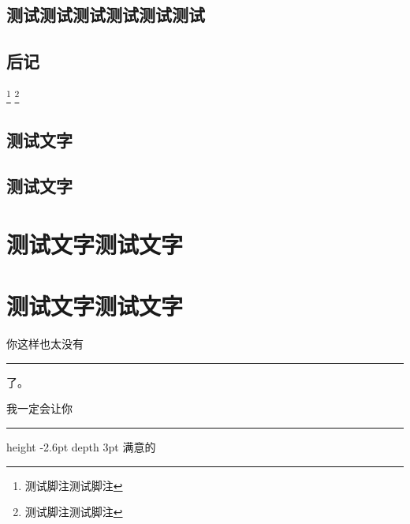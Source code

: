 \documentclass[themecolor=iris]{textbook-cn}%
\begin{document}
\chapter{测试测试测试测试测试测试}

{\FontSizeSet[3.0]{14pt}
\zhlipsum[1]

}
%
\backmatter
%
%
%
\chapter{后记}
\footnote{测试脚注测试脚注}
\lipsum
\footnote{测试脚注测试脚注}
%
%
%
\chapter{测试文字}
\zhlipsum

\cleardoublepage

\lipsum
%
%
%
\chapter{测试文字}







{
\FontSizeSet[1.0]{14pt}
\zhlipsum[2]
}

\partintro{\lipsum[2]}
\part*{测试文字测试文字}

\zhlipsum
%
%
\partsubtitle{ }
\partintro{\lipsum[2]}
\part*{测试文字测试文字}
%
\zhlipsum

你这样也太没有 \leaders \hrule{} 了。

我一定会让你 \leaders \hrule height
-2.6pt depth 3pt \hskip 2cm 满意的
\end{document}
